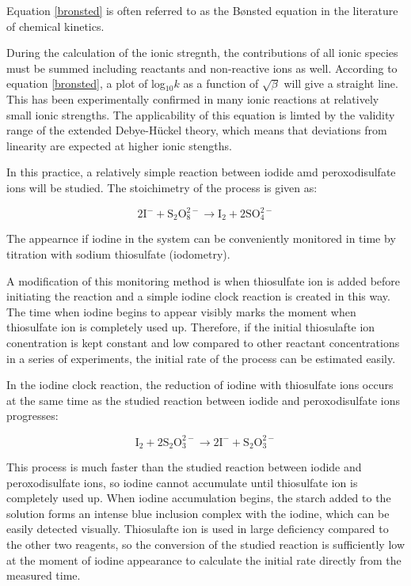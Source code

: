 Equation \eqref{bronsted} is often referred to as the B\o nsted equation in the literature of chemical kinetics.

During the calculation of the ionic stregnth, the contributions of all ionic species must be summed including reactants and non-reactive ions as well. According to equation \eqref{bronsted}, a plot of log$_{10}k$ as a function of $\sqrt{\beta}$ will give a straight line. This has been experimentally confirmed in many ionic reactions at relatively small ionic strengths. The applicability of this equation is limted by the validity range of the extended Debye-H\"uckel theory, which means that deviations from linearity are expected at higher ionic stengths.

In this practice, a relatively simple reaction between iodide amd peroxodisulfate ions will be studied. The stoichimetry of the process is given as:

 \begin{equation}
2\text{I}^{-} + \text{S}_2 \text{O}_8^{2-} \longrightarrow \text{I}_{2} + 2 \text{SO}_{4}^{2-}
\end{equation}

The appearnce if iodine in the system can be conveniently monitored in time by titration with sodium thiosulfate (iodometry).

A modification of this monitoring method is when thiosulfate ion is added before initiating the reaction and a simple iodine clock reaction is created in this way. The time when iodine begins to appear visibly marks the moment when thiosulfate ion is completely used up. Therefore, if the initial thiosulafte ion conentration is kept constant and low compared to other reactant concentrations in a series of experiments, the initial rate of the process can be estimated easily.

In the iodine clock reaction, the reduction of iodine with thiosulfate ions occurs at the same time as the studied reaction between iodide and peroxodisulfate ions progresses:

\begin{equation}
\text{I}_{2} + 2 \text{S}_2 \text{O}_3^{2-}  \longrightarrow 2 \text{I}^{-}  + \text{S}_2 \text{O}_3^{2-}
\end{equation}

This process is much faster than the studied reaction between iodide and peroxodisulfate ions, so iodine cannot accumulate until thiosulfate ion is completely used up. When iodine accumulation begins, the starch added to the solution forms an intense blue inclusion complex with the iodine, which can be easily detected visually. Thiosulafte ion is used in large deficiency compared to the other two reagents, so the conversion of the studied reaction is sufficiently low at the moment of iodine appearance to calculate the initial rate directly from the measured time.

